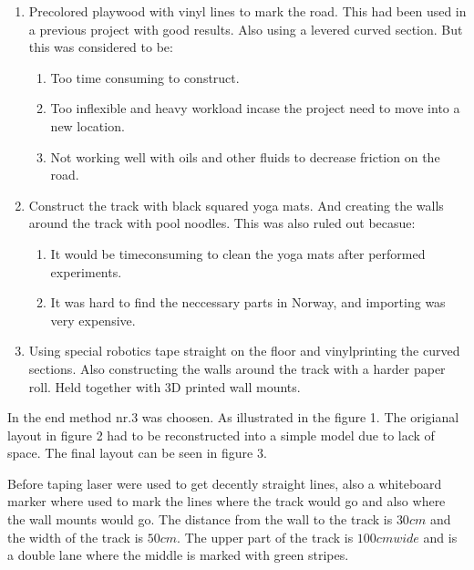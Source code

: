 \documentclass{article}
\begin{document}
	\begin{enumerate}

		  \item Precolored playwood with vinyl lines to mark the road. This had been used in a previous project with good results. Also using a levered curved section. But this was considered to be:

			\begin{enumerate}
				\item Too time consuming to construct.
				\item Too inflexible and heavy workload incase the project need to move into a new location.
				\item Not working well with oils and other fluids to decrease friction on the road.
			\end{enumerate}


 		 \item Construct the track with black squared yoga mats. And creating the walls around the track with pool noodles. This was also ruled out becasue:
			\begin{enumerate}

				\item It would be timeconsuming to clean the yoga mats after performed experiments.
				\item It was hard to find the neccessary parts in Norway, and importing was very expensive.

			\end{enumerate}

  		\item Using special robotics tape straight on the floor and vinylprinting the curved sections. Also constructing the walls around the track with a harder paper roll. Held together with 3D printed wall mounts.

	\end{enumerate}

In the end method nr.3 was choosen. As illustrated in the figure 1. The origianal layout in figure 2 had to be reconstructed into a simple model due to lack of space. The final layout can be seen in figure 3.

Before taping laser were used to get decently straight lines, also a whiteboard marker where used to mark the lines where the track would go and also where the wall mounts would go. The distance from the wall to the track is $30 cm$ and the width of the track is $50cm$. The upper part of the track is $100 cm wide$ and is a double lane where the middle is marked with green stripes.
\end{document}
